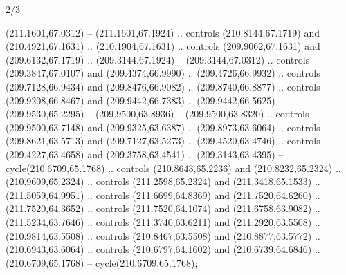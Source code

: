 \begin{flagdescription}{2/3}
\begin{scope}[xshift=0.5\flaglength,yshift=0.5\flagwidth,scale=\flagwidth/225]
\begin{scope}[y=0.8pt, x=0.8pt, yscale=-1,shift={(-210.94,-140.63)}]
  (211.1601,67.0312) -- (211.1601,67.1924) .. controls (210.8144,67.1719) and
  (210.4921,67.1631) .. (210.1904,67.1631) .. controls (209.9062,67.1631) and
  (209.6132,67.1719) .. (209.3144,67.1924) -- (209.3144,67.0312) .. controls
  (209.3847,67.0107) and (209.4374,66.9990) .. (209.4726,66.9932) .. controls
  (209.7128,66.9434) and (209.8476,66.9082) .. (209.8740,66.8877) .. controls
  (209.9208,66.8467) and (209.9442,66.7383) .. (209.9442,66.5625) --
  (209.9530,65.2295) -- (209.9500,63.8936) -- (209.9500,63.8320) .. controls
  (209.9500,63.7148) and (209.9325,63.6387) .. (209.8973,63.6064) .. controls
  (209.8621,63.5713) and (209.7127,63.5273) .. (209.4520,63.4746) .. controls
  (209.4227,63.4658) and (209.3758,63.4541) .. (209.3143,63.4395) --
  cycle(210.6709,65.1768) .. controls (210.8643,65.2236) and (210.8232,65.2324)
  .. (210.9609,65.2324) .. controls (211.2598,65.2324) and (211.3418,65.1533) ..
  (211.5059,64.9951) .. controls (211.6699,64.8369) and (211.7520,64.6260) ..
  (211.7520,64.3652) .. controls (211.7520,64.1074) and (211.6758,63.9082) ..
  (211.5234,63.7646) .. controls (211.3740,63.6211) and (211.2920,63.5508) ..
  (210.9814,63.5508) .. controls (210.8467,63.5508) and (210.8877,63.5772) ..
  (210.6943,63.6064) .. controls (210.6797,64.1602) and (210.6739,64.6846) ..
  (210.6709,65.1768) -- cycle(210.6709,65.1768);

\end{scope}
\end{scope}
\framecode{}
\end{flagdescription}

